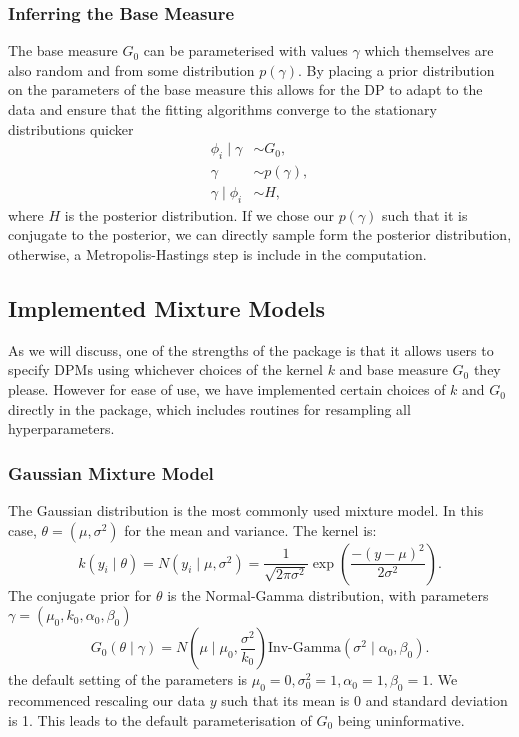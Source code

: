 \documentclass[nojss]{jss}
\begin{document}
\subsubsection{Inferring the Base Measure}

The base measure $G_0$ can be parameterised with values $\gamma$ which themselves are also random and from some distribution $p(\gamma)$. By placing a prior distribution on the parameters of the base measure this allows for the DP to adapt to the data and ensure that the fitting algorithms converge to the stationary distributions quicker
\begin{align*}
\phi _i \mid \gamma & \sim G_0, \\
\gamma & \sim p(\gamma), \\
\gamma \mid \phi _i & \sim H,
\end{align*}
where $H$ is the posterior distribution. If we chose our $p(\gamma)$ such that it is conjugate to the posterior, we can directly sample form the posterior distribution, otherwise, a Metropolis-Hastings step is include in the computation.

\subsection{Implemented Mixture Models} \label{subsec:implemented}
As we will discuss, one of the strengths of the  package is that it allows users to specify DPMs using whichever choices of the kernel $k$ and base measure $G_0$ they please. However for ease of use, we have implemented certain choices of $k$ and $G_0$ directly in the package, which includes routines for resampling all hyperparameters.

\subsubsection{Gaussian Mixture Model}
The Gaussian distribution is the most commonly used mixture model. In this case, $\theta = (\mu,\sigma^2)$ for the mean and variance. The kernel is:
\begin{equation*}
k(y_i \mid \theta) = N(y_i \mid \mu, \sigma^2) = \frac{1}{\sqrt{2\pi \sigma^2}} \exp \left( \frac{ -(y-\mu)^2}{2\sigma^2} \right).
\end{equation*}
The conjugate prior for $\theta$ is the Normal-Gamma distribution, with parameters $\gamma = (\mu_0, k_0, \alpha_0, \beta_0)$
\begin{equation*}
G_0(\theta \mid \gamma) =  N\left(\mu \mid \mu_0, \frac{\sigma^2}{k_0} \right) \text{Inv-Gamma} \left(\sigma^2 \mid \alpha_0, \beta_0 \right).
\end{equation*}
the default setting of the parameters is $\mu_0 = 0, \sigma _0 ^2 = 1, \alpha _0 = 1, \beta _0 = 1$.
We recommenced rescaling our data $y$ such that its mean is 0 and standard deviation is 1. This leads to the default parameterisation of $G_0$ being uninformative.
\end{document}
